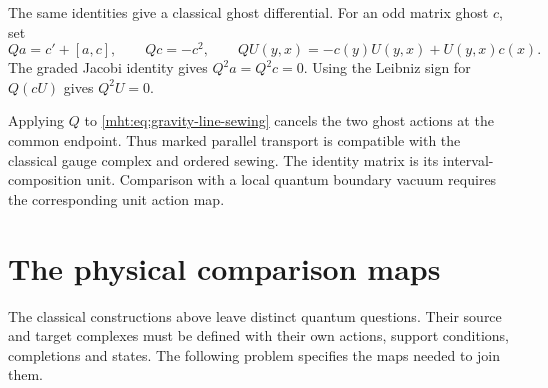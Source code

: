 The same identities give a classical ghost differential.
For an odd matrix ghost $c$, set
\[
 Qa=c'+[a,c],\qquad Qc=-c^2,
 \qquad QU(y,x)=-c(y)U(y,x)+U(y,x)c(x).
\]
The graded Jacobi identity gives $Q^2a=Q^2c=0$.
Using the Leibniz sign for $Q(cU)$ gives $Q^2U=0$.

Applying $Q$ to \eqref{mht:eq:gravity-line-sewing} cancels the
two ghost actions at the common endpoint.
Thus marked parallel transport is compatible with the
classical gauge complex and ordered sewing.
The identity matrix is its interval-composition unit.
Comparison with a local quantum boundary vacuum requires the
corresponding unit action map.

\section{The physical comparison maps}

The classical constructions above leave distinct quantum questions.
Their source and target complexes must be defined with their
own actions, support conditions, completions and states.
The following problem specifies the maps needed to join them.

